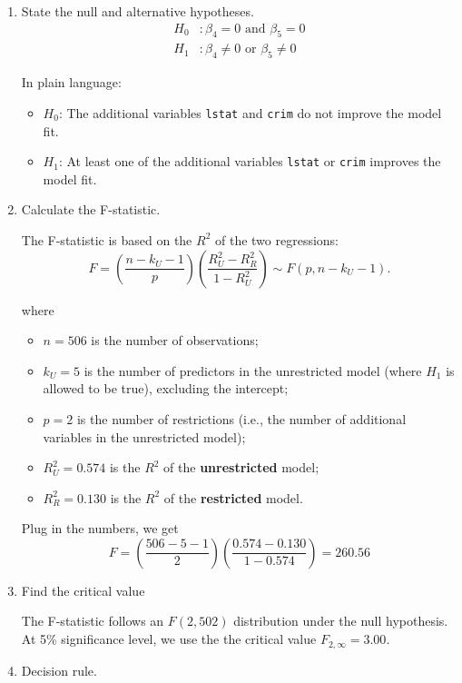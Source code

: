 \documentclass[
  12pt,
  a4paper,
]{scrbook}
\providecommand{\tightlist}{%
  \setlength{\itemsep}{0pt}\setlength{\parskip}{0pt}}
\renewcommand{\tightlist}{\setlength{\itemsep}{0.5\baselineskip}\setlength{\parskip}{0.2\baselineskip}}
\theoremstyle{plain}
\theoremstyle{definition}
\theoremstyle{remark}
\begin{document}
\begin{enumerate}
\def\labelenumi{\arabic{enumi}.}
\item
  State the null and alternative hypotheses. \[
  \begin{aligned}
  H_0 &: \beta_4 = 0 \text{ and } \beta_5 = 0 \\
  H_1 &: \beta_4 \ne 0 \text{ or } \beta_5 \ne 0
  \end{aligned}
  \]

  In plain language:

  \begin{itemize}
  \tightlist
  \item
    \(H_0\): The additional variables \texttt{lstat} and \texttt{crim}
    do not improve the model fit.
  \item
    \(H_1\): At least one of the additional variables \texttt{lstat} or
    \texttt{crim} improves the model fit.
  \end{itemize}
\item
  Calculate the F-statistic.

  The F-statistic is based on the \(R^2\) of the two regressions: \[
  F = \left(\frac{n - k_U -1}{p}\right) \left(\frac{R_U^2-R_R^2}{1-R_U^2}\right) \sim F(p, n-k_U-1) .
  \]

  where

  \begin{itemize}
  \tightlist
  \item
    \(n = 506\) is the number of observations;
  \item
    \(k_U = 5\) is the number of predictors in the unrestricted model
    (where \(H_1\) is allowed to be true), excluding the intercept;
  \item
    \(p = 2\) is the number of restrictions (i.e., the number of
    additional variables in the unrestricted model);
  \item
    \(R_U^2 = 0.574\) is the \(R^2\) of the \textbf{unrestricted} model;
  \item
    \(R_R^2 = 0.130\) is the \(R^2\) of the \textbf{restricted} model.
  \end{itemize}

  Plug in the numbers, we get \[
  F = \left(\frac{506-5-1}{2}\right) \left(\frac{0.574-0.130}{1-0.574}\right) = 260.56
  \]
\item
  Find the critical value

  The F-statistic follows an \(F(2, 502)\) distribution under the null
  hypothesis. At 5\% significance level, we use the the critical value
  \(F_{2,\infty}=3.00.\)
\item
  Decision rule.


\end{enumerate}
\end{document}
